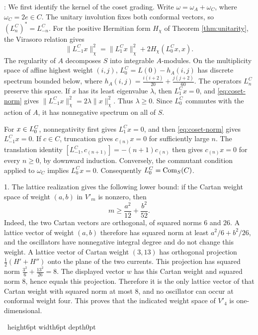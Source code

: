 \documentclass[leqno]{article}
\renewcommand{\geq}{\ensuremath{\geqslant}}
\newcommand{\qed}{\hfill \vrule height6pt  width6pt depth0pt}
\let\ker\relax
\DeclareMathOperator{\ker}{Ker}
\newenvironment{proof}[1][]{\noindent {\it Proof #1} : }{\hbox{~}\qed
\smallskip
}
\numberwithin{equation}{section}
\begin{document}
\begin{proof}
We first identify the kernel of the coset grading. Write $\omega = \omega_A + \omega_C$, where $\omega_C = 2e \in C$. The unitary involution fixes both conformal vectors, so $(L^C_n)^* = L^C_{-n}$. For the positive Hermitian form $H_\chi$ of Theorem \ref{thm:unitarity}, the Virasoro relation gives
\begin{equation}
\label{eq:coset-norm}
\|L^C_{-1}x\|_\chi^2 = \|L^C_1x\|_\chi^2 + 2H_\chi(L^C_0x,x).
\end{equation}
The regularity of $A$ decomposes $S$ into integrable $A$-modules. On the multiplicity space of affine highest weight $(i,j)$, $L^C_0 = L(0)-h_A(i,j)$ has discrete spectrum bounded below, where $h_A(i,j) = \frac{i(i+2)}{20} + \frac{j(j+2)}{60}$. The operators $L^C_n$ preserve this space. If $x$ has its least eigenvalue $\lambda$, then $L^C_1x = 0$, and \eqref{eq:coset-norm} gives $\|L^C_{-1}x\|_\chi^2 = 2\lambda\|x\|_\chi^2$. Thus $\lambda \geq 0$. Since $L^C_0$ commutes with the action of $A$, it has nonnegative spectrum on all of $S$.

For $x \in \ker L^C_0$, nonnegativity first gives $L^C_1x = 0$, and then \eqref{eq:coset-norm} gives $L^C_{-1}x = 0$. If $c \in C$, truncation gives $c_{(n)}x = 0$ for sufficiently large $n$. The translation identity $[L^C_{-1},c_{(n+1)}] = -(n+1)c_{(n)}$ then gives $c_{(n)}x = 0$ for every $n \geq 0$, by downward induction. Conversely, the commutant condition applied to $\omega_C$ implies $L^C_0x = 0$. Consequently $\ker L^C_0 = \operatorname{Com}_S(C)$.

1. The lattice realization gives the following lower bound: if the Cartan weight space of weight $(a,b)$ in $V'_m$ is nonzero, then
\begin{equation}
\label{eq:cartan-energy-bound}
m \geq \frac{a^2}{12} + \frac{b^2}{52}.
\end{equation}
Indeed, the two Cartan vectors are orthogonal, of squared norms $6$ and $26$. A lattice vector of weight $(a,b)$ therefore has squared norm at least $a^2/6+b^2/26$, and the oscillators have nonnegative integral degree and do not change this weight. A lattice vector of Cartan weight $(3,13)$ has orthogonal projection $\frac12(H'+H'')$ onto the plane of the two currents. This projection has squared norm $\frac{3^2}{6}+\frac{13^2}{26} = 8$. The displayed vector $w$ has this Cartan weight and squared norm $8$, hence equals this projection. Therefore it is the only lattice vector of that Cartan weight with squared norm at most $8$, and no oscillator can occur at conformal weight four. This proves that the indicated weight space of $V'_4$ is one-dimensional.


\end{proof}
\end{document}
